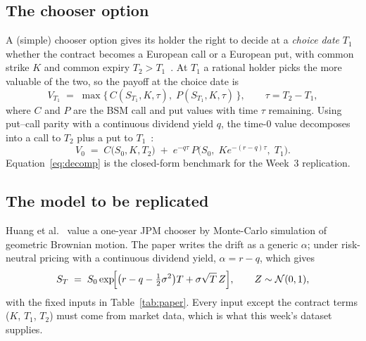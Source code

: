 \documentclass[11pt]{article}
\begin{document}
\subsection{The chooser option}
A (simple) chooser option gives its holder the right to decide at a \emph{choice date} $T_1$ whether the contract
becomes a European call or a European put, with common strike $K$ and common expiry $T_2 > T_1$~\cite{rubinstein1991}.
At $T_1$ a rational holder picks the more valuable of the two, so the payoff at the choice date is
\begin{equation}
  V_{T_1} \;=\; \max\!\bigl\{\, C(S_{T_1}, K, \tau),\; P(S_{T_1}, K, \tau) \,\bigr\}, \qquad \tau = T_2 - T_1,
  \label{eq:payoff}
\end{equation}
where $C$ and $P$ are the BSM call and put values with time $\tau$ remaining. Using put--call parity with a
continuous dividend yield $q$, the time-0 value decomposes into a call to $T_2$ plus a put to $T_1$~\cite{hull}:
\begin{equation}
  V_0 \;=\; C\bigl(S_0, K, T_2\bigr) \;+\; e^{-q\tau}\, P\!\bigl(S_0,\; K e^{-(r-q)\tau},\; T_1\bigr).
  \label{eq:decomp}
\end{equation}
Equation~\eqref{eq:decomp} is the closed-form benchmark for the Week~3 replication.

\subsection{The model to be replicated}
Huang et al.~\cite{huang2021} value a one-year JPM chooser by Monte-Carlo simulation of geometric Brownian motion.
The paper writes the drift as a generic $\alpha$; under risk-neutral pricing with a continuous dividend yield,
$\alpha = r - q$, which gives
\begin{equation}
  S_T \;=\; S_0 \exp\!\Bigl[\bigl(r - q - \tfrac12\sigma^2\bigr)T + \sigma\sqrt{T}\,Z\Bigr], \qquad Z\sim\mathcal N(0,1),
  \label{eq:gbm}
\end{equation}
with the fixed inputs in Table~\ref{tab:paper}. Every input except the contract terms ($K$, $T_1$, $T_2$) must
come from market data, which is what this week's dataset supplies.
\end{document}
